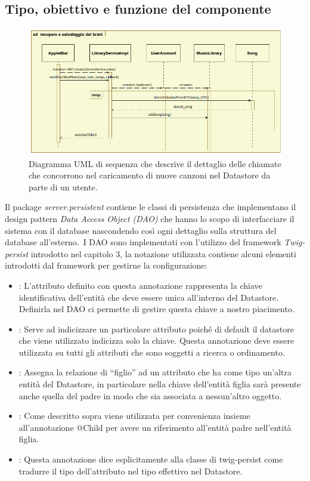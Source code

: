 \subsection*{Tipo, obiettivo e funzione del componente}
\begin{figure}[!h]
  \centering
  \includegraphics[width=17cm]{img/DP/sequences.png}
\caption{Diagramma UML di sequenza che descrive il dettaglio delle chiamate
che concorrono nel caricamento di nuove canzoni nel Datastore da parte di un
utente.}
\end{figure}
Il package \emph{server.persistent} contiene le classi di persistenza che
implementano il design pattern \emph{Data Access Object (DAO)} che hanno lo
scopo di interfacciare il sistema con il database nascondendo cos\`i ogni
dettaglio sulla struttura del database all'esterno.\
I DAO sono implementati con l'utilizzo del framework \emph{Twig-persist}
introdotto nel capitolo 3, la notazione utilizzata contiene alcuni elementi
introdotti dal framework per gestirne la configurazione: 
\begin{itemize}
  \item {}: L'attributo definito con questa annotazione rappresenta la
  chiave identificativa dell'entit\`a che deve essere unica all'interno del
  Datastore. Definirla nel DAO ci permette di gestire questa chiave a nostro
  piacimento.
  \item {}: Serve ad indicizzare un particolare attributo poich\'e di
  default il datastore che viene utilizzato indicizza solo la chiave. Questa
  annotazione deve essere utilizzata su tutti gli attributi che sono soggetti a
  ricerca o ordinamento.
  \item {}: Assegna la relazione di ``figlio'' ad un attributo
  che ha come tipo un'altra entit\`a del Datastore, in particolare nella chiave
  dell'entit\`a figlia sar\`a presente anche quella del padre in modo che sia
  associata a nessun'altro oggetto.
  \item {}: Come descritto sopra viene utilizzata per convenienza
  insieme all'annotazione @Child per avere un riferimento all'entit\`a padre
  nell'entit\`a figlia.
  \item {}: Questa annotazione dice esplicitamente alla
  classe di twig-persist \co{ObjectFieldTraslator} come tradurre il tipo dell'attributo
  nel tipo effettivo nel Datastore.
\end{itemize}
